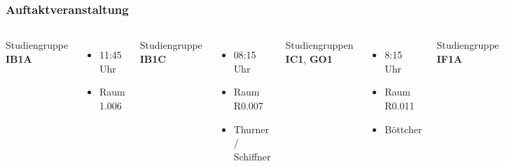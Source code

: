 \documentclass{beamer}
\begin{document}
    \begin{frame} 
    	\frametitle{Auftaktveranstaltung}
    	\begin{columns}
    		Studiengruppe \textbf{IB1A}
    		\begin{itemize}
    			\item 11:45 Uhr
    			\item Raum 1.006
    		\end{itemize}
    		\bigskip
    		Studiengruppe \textbf{IB1C}
    		\begin{itemize}
    			\item 08:15 Uhr
    			\item Raum R0.007
    			\item Thurner / Schiffner
    		\end{itemize}
    		\bigskip
    		Studiengruppen \textbf{IC1}, \textbf{GO1}
    		\begin{itemize}
    			\item 8:15 Uhr
    			\item Raum R0.011
    			\item Böttcher
    		\end{itemize}
    		Studiengruppe \textbf{IF1A}
    		\begin{itemize}
    			\item 12:30 Uhr
    			\item Raum R1.007
    			\item Hobelsberger
    		\end{itemize}
    		\bigskip
    		Studiengruppe \textbf{IF1B}
    		\begin{itemize}
    			\item 12:30 Uhr
    			\item Raum R2.007
    			\item Orehek
    		\end{itemize}
    	\end{columns}
    \end{frame}
    
    
    
\end{document}
